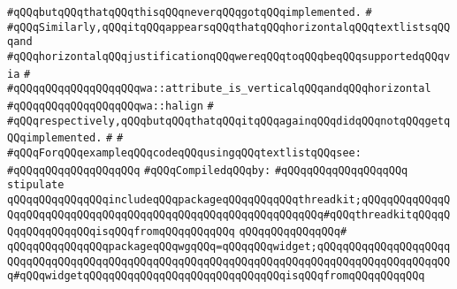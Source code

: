 \verb|#qQQqbutqQQqthatqQQqthisqQQqneverqQQqgotqQQqimplemented.|\newline
\verb|#|\newline
\verb|#qQQqSimilarly,qQQqitqQQqappearsqQQqthatqQQqhorizontalqQQqtextlistsqQQqand|\newline
\verb|#qQQqhorizontalqQQqjustificationqQQqwereqQQqtoqQQqbeqQQqsupportedqQQqvia|\newline
\verb|#|\newline
\verb|#qQQqqQQqqQQqqQQqqQQqwa::attribute_is_verticalqQQqandqQQqhorizontal|\newline
\verb|#qQQqqQQqqQQqqQQqqQQqwa::halign|\newline
\verb|#|\newline
\verb|#qQQqrespectively,qQQqbutqQQqthatqQQqitqQQqagainqQQqdidqQQqnotqQQqgetqQQqimplemented.|\newline
\verb|#|\newline
\verb|#|\newline
\verb|#qQQqForqQQqexampleqQQqcodeqQQqusingqQQqtextlistqQQqsee:|\newline
\verb|#qQQqqQQqqQQqqQQqqQQq|\newline
\newline
\verb|#qQQqCompiledqQQqby:|\newline
\verb|#qQQqqQQqqQQqqQQqqQQq|\newline
\newline
\newline
\newline
\verb|stipulate|\newline
\verb|qQQqqQQqqQQqqQQqincludeqQQqpackageqQQqqQQqqQQqthreadkit;qQQqqQQqqQQqqQQqqQQqqQQqqQQqqQQqqQQqqQQqqQQqqQQqqQQqqQQqqQQqqQQq#qQQqthreadkitqQQqqQQqqQQqqQQqqQQqisqQQqfromqQQqqQQqqQQq|\newline
\verb|qQQqqQQqqQQqqQQq#|\newline
\verb|qQQqqQQqqQQqqQQqpackageqQQqwgqQQq=qQQqqQQqwidget;qQQqqQQqqQQqqQQqqQQqqQQqqQQqqQQqqQQqqQQqqQQqqQQqqQQqqQQqqQQqqQQqqQQqqQQqqQQqqQQqqQQqqQQqqQQq#qQQqwidgetqQQqqQQqqQQqqQQqqQQqqQQqqQQqqQQqisqQQqfromqQQqqQQqqQQq|\newline
